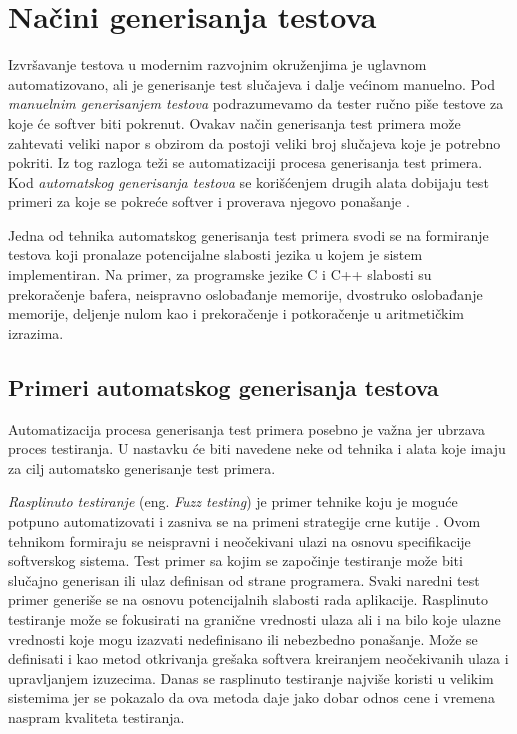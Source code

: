 \documentclass[12pt,oneside]{memoir}
\begin{document}
\section{Načini generisanja testova} \label{broj5}

Izvršavanje testova u modernim razvojnim okruženjima je uglavnom automatizovano, ali je generisanje test slučajeva i dalje većinom manuelno. Pod \emph{manuelnim generisanjem testova} podrazumevamo da tester ručno piše testove za koje će softver biti pokrenut. Ovakav način generisanja test primera može zahtevati veliki napor s obzirom da postoji veliki broj slučajeva koje je potrebno pokriti. Iz tog razloga teži se automatizaciji procesa generisanja test primera. Kod \emph{automatskog generisanja testova} se korišćenjem drugih alata dobijaju test primeri za koje se pokreće softver i proverava njegovo ponašanje \cite{AutomatedTestGeneration}. \par
Jedna od tehnika automatskog generisanja test primera svodi se na formiranje testova koji pronalaze potencijalne slabosti jezika u kojem je sistem implementiran.
Na primer, za programske jezike C i C++ slabosti su prekoračenje bafera, neispravno oslobađanje memorije, dvostruko oslobađanje memorije, deljenje nulom kao i prekoračenje i potkoračenje u aritmetičkim izrazima.


\subsection{Primeri automatskog generisanja testova}
Automatizacija procesa generisanja test primera posebno je važna jer ubrzava proces testiranja. U nastavku će biti navedene neke od tehnika i alata koje imaju za cilj automatsko generisanje test primera. 


\emph{Rasplinuto testiranje} (eng. \textit{Fuzz testing}) je primer tehnike koju je moguće potpuno automatizovati i zasniva se na primeni strategije crne kutije \cite{FuzzTestingForDummies}. 
Ovom tehnikom formiraju se neispravni i neočekivani ulazi na osnovu specifikacije softverskog sistema.
Test primer sa kojim se započinje testiranje može biti slučajno generisan ili ulaz definisan od strane programera. Svaki naredni test primer generiše se na osnovu potencijalnih slabosti rada aplikacije. Rasplinuto testiranje može se fokusirati na granične vrednosti ulaza ali i na bilo koje ulazne vrednosti koje mogu izazvati nedefinisano ili nebezbedno ponašanje. Može se definisati i kao metod otkrivanja grešaka softvera kreiranjem neočekivanih ulaza i upravljanjem izuzecima. Danas se rasplinuto testiranje najviše koristi u velikim sistemima jer se pokazalo da ova metoda daje jako dobar odnos cene i vremena naspram kvaliteta testiranja. 
\par
\end{document}

